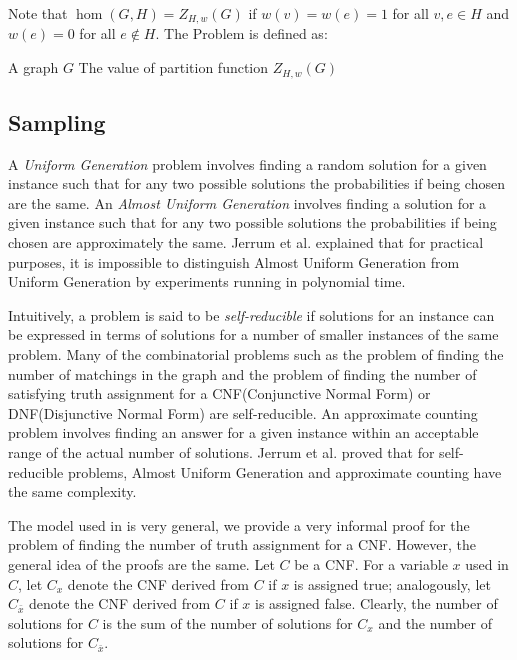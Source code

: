 Note that \(\hom(G,H)=Z_{H,w}(G)\) if \(w(v)=w(e)=1\) for all \(v,e\in H\)
and \(w(e)=0\) for all \(e\not\in H\)\@. 
The  Problem is defined as:

\pnndef%
{A graph \(G\)}
{The value of partition function \(Z_{H,w}(G)\)}

\subsection*{Sampling}
A \emph{Uniform Generation} problem involves finding a
random solution for a given instance such that for any two possible solutions
the probabilities if being chosen are the same.
An \emph{Almost Uniform Generation} involves finding 
a solution for a given instance such that
for any two possible solutions the probabilities if being chosen are approximately the same.
Jerrum et al. \cite{JVV} explained that
for practical purposes, it is impossible to distinguish
Almost Uniform Generation from Uniform Generation by experiments running in polynomial time.

Intuitively, a problem is said to be \emph{self-reducible} if solutions for an instance can be
expressed in terms of solutions for a number of smaller instances of the same problem.
Many of the combinatorial problems such as the problem of finding the number of matchings in the graph
and the problem of finding the number of satisfying truth assignment for a
CNF(Conjunctive Normal Form) or
DNF(Disjunctive Normal Form) are self-reducible.
An approximate counting problem involves finding an answer for a given
instance within an acceptable range of the actual number of solutions.
Jerrum et al. \cite{JVV} proved that 
for self-reducible problems, Almost Uniform Generation and approximate counting 
have the same complexity.

The model used in \cite{JVV} is very general, we provide a very informal 
proof for the problem of finding the number of truth assignment for a CNF\@.
However, the general idea of the proofs are the same.
Let \(C\) be a CNF\@.
For a variable \(x\) used in \(C\), let \(C_x\) denote 
the CNF derived from \(C\) if \(x\) is assigned true; analogously, let \(C_{\bar x}\) denote
the CNF derived from \(C\) if \(x\) is assigned false. Clearly, the number of solutions for
\(C\) is the sum of the number of solutions for \(C_x\) and the number of solutions 
for \(C_{\bar x}\)\@.

